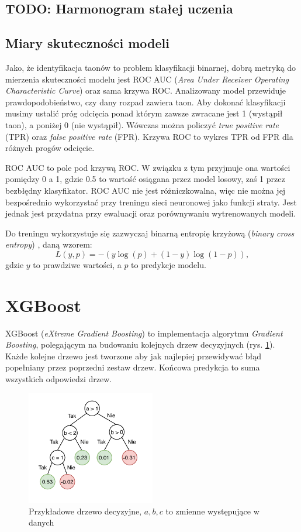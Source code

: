 \documentclass{pracalicmgr}
\begin{document}
	\subsection{TODO: Harmonogram stałej uczenia}
	
	\subsection{Miary skuteczności modeli}
	Jako, że identyfikacja taonów to problem klasyfikacji binarnej, dobrą metryką do mierzenia skuteczności modelu jest ROC AUC (\textit{Area Under Receiver Operating Characteristic Curve}) oraz sama krzywa ROC. Analizowany model przewiduje prawdopodobieństwo, czy dany rozpad zawiera taon. Aby dokonać klasyfikacji musimy ustalić próg odcięcia ponad którym zawsze zwracane jest 1 (wystąpił taon), a poniżej 0 (nie wystąpił). Wówczas można policzyć \textit{true positive rate} (TPR) oraz \textit{false positive rate} (FPR). Krzywa ROC to wykres TPR od FPR dla różnych progów odcięcie.
	
	ROC AUC to pole pod krzywą ROC. W związku z tym przyjmuje ona wartości pomiędzy 0 a 1, gdzie 0.5 to wartość osiągana przez model losowy, zaś 1 przez bezbłędny klasyfikator. ROC AUC nie jest różniczkowalna, więc nie można jej bezpośrednio wykorzystać przy treningu sieci neuronowej jako funkcji straty. Jest jednak jest przydatna przy ewaluacji oraz porównywaniu wytrenowanych modeli.
	
	Do treningu wykorzystuje się zazwyczaj binarną entropię krzyżową (\textit{binary cross entropy}) \cite{dl}, daną wzorem: $$ L(y, p) = -(y\log(p)+(1-y)\log(1-p)),$$ gdzie $y$ to prawdziwe wartości, a $p$ to predykcje modelu.
	
	\section{XGBoost}
	XGBoost (\textit{eXtreme Gradient Boosting}) \cite{xgboost} to implementacja algorytmu \textit{Gradient Boosting}, polegającym na budowaniu kolejnych drzew decyzyjnych (rys. \ref{fig:tree}). Każde kolejne drzewo jest tworzone aby jak najlepiej przewidywać błąd popełniany przez poprzedni zestaw drzew. Końcowa predykcja to suma wszystkich odpowiedzi drzew.
	
	\begin{figure}[h]
	\centering
	\includegraphics[width=0.5\textwidth]{tree.pdf}
	\caption{Przykładowe drzewo decyzyjne, $a, b, c$ to zmienne występujące w danych}
	\label{fig:tree}
	\end{figure}
	
\end{document}
